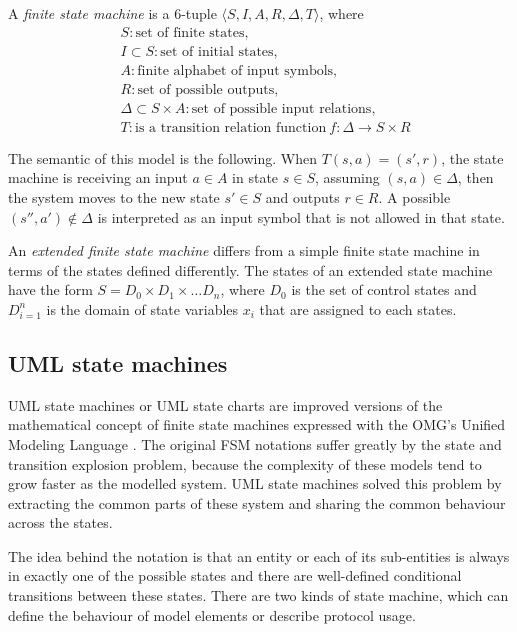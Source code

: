 A \textit{finite state machine} is a 6-tuple $\langle S, I, A, R, \Delta, T\rangle$, where
\begin{align*}
& S: \text{set of finite states},\\
& I \subset S: \text{set of initial states},\\
& A: \text{finite alphabet of input symbols},\\
& R: \text{set of possible outputs},\\
& \Delta \subset S \times A: \text{set of possible input relations},\\
& T: \text{is a transition relation function}\ f: \Delta \rightarrow S \times R
\end{align*}

The semantic of this model is the following. When $T(s, a) = (s', r)$, the state machine is receiving an input $a \in A$ in state $s \in S$, assuming $(s,a) \in \Delta$, then the system moves to the new state $s' \in S$ and outputs $r \in R$. A possible $(s'', a') \notin \Delta$ is interpreted as an input symbol that is not allowed in that state.

An \textit{extended finite state machine} differs from a simple finite state machine in terms of the states defined differently. The states of an extended state machine have the form $S = D_0 \times D_1 \times \dots D_n$, where $D_0$ is the set of control states and $D_{i=1}^n$ is the domain of state variables $x_i$ that are assigned to each states.


\subsection{UML state machines}
\label{sub:umlstatemachine}

UML state machines or UML state charts are improved versions of the mathematical concept of finite state machines expressed with the OMG's Unified Modeling Language \cite{omguml}. The original FSM notations suffer greatly by the state and transition explosion problem, because the complexity of these models tend to grow faster as the modelled system. UML state machines solved this problem by extracting the common parts of these system and sharing the common behaviour across the states.

The idea behind the notation is that an entity or each of its sub-entities is always in exactly one of the possible states and there are well-defined conditional transitions between these states. There are two kinds of state machine, which can define the behaviour of model elements or describe protocol usage.


